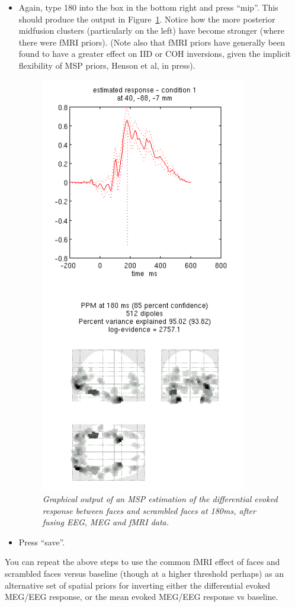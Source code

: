 \begin{itemize}
\item Again, type 180 into the box in the bottom right and press ``mip''. This should produce the output in Figure~\ref{multimodal:fusion:fig:4}.  Notice how the more posterior midfusion clusters (particularly on the left) have become stronger (where there were fMRI priors). (Note also that fMRI priors have generally been found to have a greater effect on IID or COH inversions, given the implicit flexibility of MSP priors, Henson et al, in press).

\begin{figure}
\begin{center}
\includegraphics[width=90mm]{multimodal/figures/fused_eeg_meg_msp_fmri.png}
\caption{\em Graphical output of an MSP estimation of the differential evoked response between faces and scrambled faces at 180ms, after fusing EEG, MEG and fMRI data. \label{multimodal:fusion:fig:4}}
\end{center}
\end{figure}


\item Press ``save''.

\end{itemize}

You can repeat the above steps to use the common fMRI effect of faces and scrambled faces versus baseline (though at a higher threshold perhaps) as an alternative set of spatial priors for inverting either the differential evoked MEG/EEG response, or the mean evoked MEG/EEG response vs baseline. 
